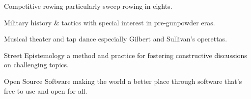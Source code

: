 

\begin{cvhonors}

    \cvhonor
        {Competitive rowing} %
        {particularly sweep rowing in eights.} %
        {} %
        {\textbullet} %
    
    \cvhonor
        {Military history \& tactics} %
        {with special interest in pre-gunpowder eras.} %
        {} %
        {\textbullet} %

    \cvhonor
        {Musical theater and tap dance} %
        {especially Gilbert and Sullivan’s operettas.} %
        {} %
        {\textbullet} %

    \cvhonor
        {Street Epistemology} %
        {a method and practice for fostering constructive discussions on challenging topics.} %
        {} %
        {\textbullet} %

    \cvhonor
        {Open Source Software} %
        {making the world a better place through software that's free to use and open for all.} %
        {} %
        {\textbullet} %
    \end{cvhonors}